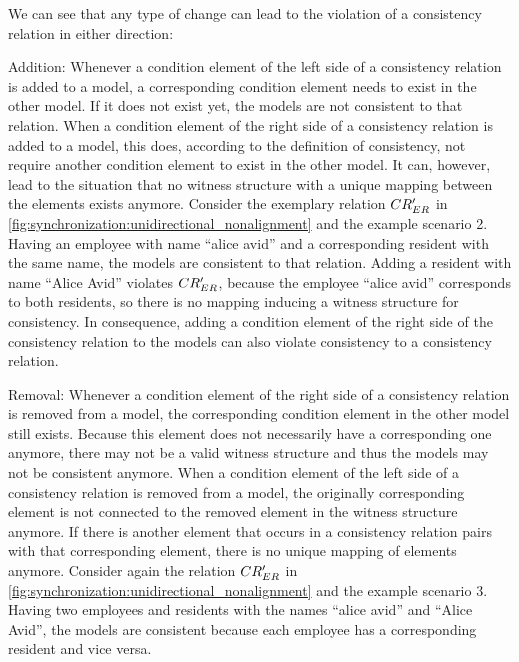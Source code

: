 We can see that any type of change can lead to the violation of a consistency relation in either direction:
\begin{properdescription}
    \item[Addition:] Whenever a condition element of the left side of a consistency relation is added to a model, a corresponding condition element needs to exist in the other model. If it does not exist yet, the models are not consistent to that relation.
    When a condition element of the right side of a consistency relation is added to a model, this does, according to the definition of consistency, not require another condition element to exist in the other model. It can, however, lead to the situation that no witness structure with a unique mapping between the elements exists anymore.
    Consider the exemplary relation $CR_{ER}'$ in \autoref{fig:synchronization:unidirectional_nonalignment} and the example scenario 2.
    Having an employee with name \enquote{alice avid} and a corresponding resident with the same name, the models are consistent to that relation.
    Adding a resident with name \enquote{Alice Avid} violates $CR_{ER}'$, because the employee \enquote{alice avid} corresponds to both residents, so there is no mapping inducing a witness structure for consistency.
    In consequence, adding a condition element of the right side of the consistency relation to the models can also violate consistency to a consistency relation.
    \item[Removal:] Whenever a condition element of the right side of a consistency relation is removed from a model, the corresponding condition element in the other model still exists. Because this element does not necessarily have a corresponding one anymore, there may not be a valid witness structure and thus the models may not be consistent anymore.
    When a condition element of the left side of a consistency relation is removed from a model, the originally corresponding element is not connected to the removed element in the witness structure anymore. If there is another element that occurs in a consistency relation pairs with that corresponding element, there is no unique mapping of elements anymore.
    Consider again the relation $CR_{ER}'$ in \autoref{fig:synchronization:unidirectional_nonalignment} and the example scenario 3.
    Having two employees and residents with the names \enquote{alice avid} and \enquote{Alice Avid}, the models are consistent because each employee has a corresponding resident and vice versa.

\end{properdescription}
